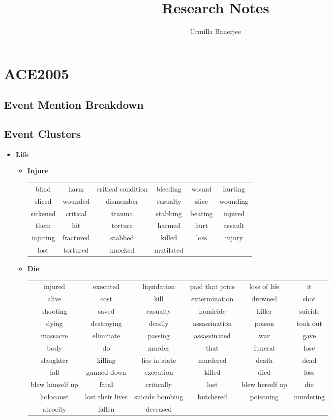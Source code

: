 \documentclass[11pt, oneside]{article}   	%
\title{Research Notes}
\author{Urmilla Banerjee}
\begin{document}
\maketitle

\section{ACE2005}

\subsection{Event Mention Breakdown}


\subsection{Event Clusters}
\begin{itemize}
\item[] \textbf{Life} 
	\vspace*{-0.2cm}
	\begin{itemize}
	\item[] \textbf{Injure} \\
		 \begin{tabular}{ c c c c c c }
		blind & harm & critical
condition & bleeding & wound & hurting\\sliced & wounded & dismember & casualty & slice & wounding\\sickened & critical & trauma & stabbing & beating & injured\\them & hit & torture & harmed & hurt & assault\\injuring & fractured & stabbed & killed & loss & injury\\lost & tortured & knocked & mutilated
		\end{tabular}
	\item[] \textbf{Die} \\
		 \begin{tabular}{ c c c c c c }
		injured & executed & liquidation & paid that price & loss of life & it\\alive & cost & kill & extermination & drowned & shot\\shooting & saved & casualty & homicide & killer & suicide\\dying & destroying & deadly & assassination & poison & took out\\massacre & eliminate & passing & assassinated & war & gave\\body & do & murder & that & funeral & lose\\slaughter & killing & lies in state & murdered & death & dead\\fall & gunned down & execution & killed & died & loss\\blew himself up & fatal & critically & lost & blew herself up & die\\holocaust & lost their lives & suicide bombing & butchered & poisoning & murdering\\atrocity & fallen & deceased

\end{tabular}
\end{itemize}
\end{itemize}
\end{document}
